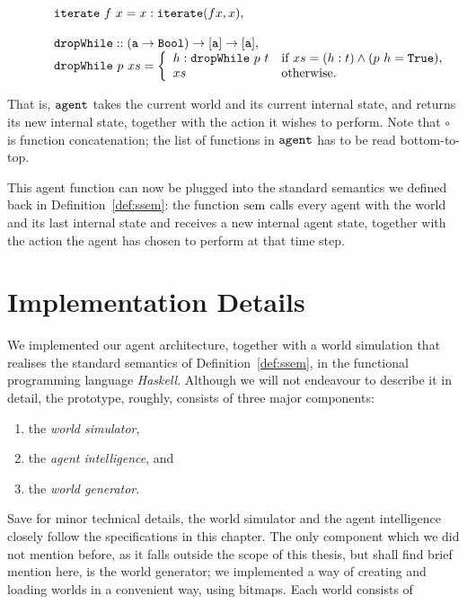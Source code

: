 \begin{definition}
$$\begin{array}{l}
			\quad \quad \quad \mathtt{iterate}\ f\ x = x : \mathtt{iterate}(f x,x),\\
			\\
			\quad \quad \quad \mathtt{dropWhile} :: \mathtt{(a \rightarrow Bool) \rightarrow [a] \rightarrow [a]},\\
			\quad \quad \quad \mathtt{dropWhile}\ p\ xs  = \left\{
				\begin{array}{l l}
					h : \mathtt{dropWhile}\ p\ t & \textnormal{if } xs = (h:t) \wedge (p\ h = \mathtt{True}),\\
					xs & \textnormal{otherwise}.\\
				\end{array}
			\right.\\
		\end{array}
	$$
\end{definition}

That is, $\mathtt{agent}$ takes the current world and its current internal state, and returns its new internal state, together with the action it wishes to perform. Note that $\circ$ is function concatenation; the list of functions in $\mathtt{agent}$ has to be read bottom-to-top.

This agent function can now be plugged into the standard semantics we defined back in Definition~\ref{def:ssem}: the function $\mathrm{sem}$ calls every agent with the world and its last internal state and receives a new internal agent state, together with the action the agent has chosen to perform at that time step.

\section{Implementation Details}

We implemented our agent architecture, together with a world simulation that realises the standard semantics of Definition~\ref{def:ssem}, in the functional programming language \emph{Haskell}. Although we will not endeavour to describe it in detail, the prototype, roughly, consists of three major components:

\begin{enumerate}
	\item the \emph{world simulator},
	\item the \emph{agent intelligence}, and
	\item the \emph{world generator}.
\end{enumerate}

Save for minor technical details, the world simulator and the agent intelligence closely follow the specifications in this chapter. The only component which we did not mention before, as it falls outside the scope of this thesis, but shall find brief mention here, is the world generator; we implemented a way of creating and loading worlds in a convenient way, using bitmaps. Each world consists of


